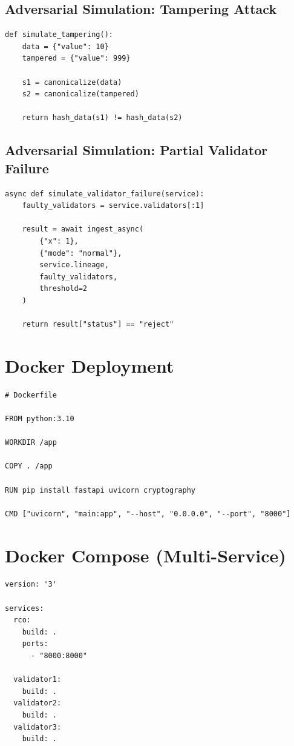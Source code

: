 \subsection{Adversarial Simulation: Tampering Attack}

\begin{verbatim}
def simulate_tampering():
    data = {"value": 10}
    tampered = {"value": 999}

    s1 = canonicalize(data)
    s2 = canonicalize(tampered)

    return hash_data(s1) != hash_data(s2)
\end{verbatim}

\subsection{Adversarial Simulation: Partial Validator Failure}

\begin{verbatim}
async def simulate_validator_failure(service):
    faulty_validators = service.validators[:1]

    result = await ingest_async(
        {"x": 1},
        {"mode": "normal"},
        service.lineage,
        faulty_validators,
        threshold=2
    )

    return result["status"] == "reject"
\end{verbatim}

\section{Docker Deployment}

\begin{verbatim}
# Dockerfile

FROM python:3.10

WORKDIR /app

COPY . /app

RUN pip install fastapi uvicorn cryptography

CMD ["uvicorn", "main:app", "--host", "0.0.0.0", "--port", "8000"]
\end{verbatim}

\section{Docker Compose (Multi-Service)}

\begin{verbatim}
version: '3'

services:
  rco:
    build: .
    ports:
      - "8000:8000"

  validator1:
    build: .
  validator2:
    build: .
  validator3:
    build: .
\end{verbatim}

